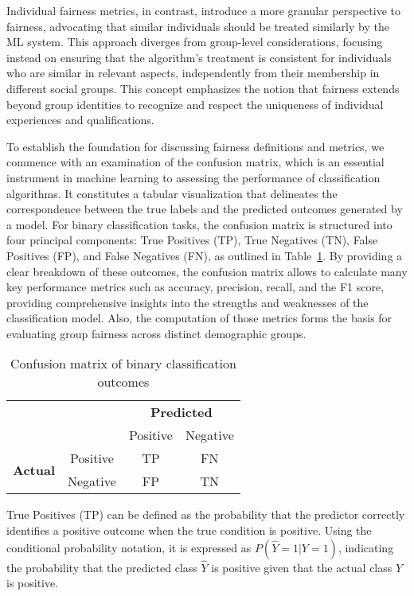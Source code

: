 Individual fairness metrics, in contrast, introduce a more granular perspective to fairness, advocating that similar individuals should be treated similarly by the ML system. This approach diverges from group-level considerations, focusing instead on ensuring that the algorithm’s treatment is consistent for individuals who are similar in relevant aspects, independently from their membership in different social groups. This concept emphasizes the notion that fairness extends beyond group identities to recognize and respect the uniqueness of individual experiences and qualifications.

To establish the foundation for discussing fairness definitions and metrics, we commence with an examination of the confusion matrix, which is an essential instrument in machine learning to assessing the performance of classification algorithms. It constitutes a tabular visualization that delineates the correspondence between the true labels and the predicted outcomes generated by a model. For binary classification tasks, the confusion matrix is structured into four principal components: True Positives (TP), True Negatives (TN), False Positives (FP), and False Negatives (FN), as outlined in Table~\ref{tab:confusion_matrix_definition}. By providing a clear breakdown of these outcomes, the confusion matrix allows to calculate many key performance metrics such as accuracy, precision, recall, and the F1 score, providing comprehensive insights into the strengths and weaknesses of the classification model. Also, the computation of those metrics forms the basis for evaluating group fairness across distinct demographic groups.

\begin{table}[h]
    \centering
    \caption{Confusion matrix of binary classification outcomes} \label{tab:confusion_matrix_definition}
    \begin{tabular}{cc|c|c|}
    \cline{3-4}
     & & \multicolumn{2}{c|}{\textbf{Predicted}} \\ \cline{3-4}
     & & Positive & Negative \\ \hline
    \multicolumn{1}{|c|}{\multirow{2}{*}{\textbf{Actual}}} & Positive & TP & FN \\ \cline{2-4}
    \multicolumn{1}{|c|}{} & Negative & FP & TN \\ \hline
    \end{tabular}
\end{table}


True Positives (TP) can be defined as the probability that the predictor correctly identifies a positive outcome when the true condition is positive. Using the conditional probability notation, it is expressed as $P(\hat{Y}=1|Y=1)$, indicating the probability that the predicted class $\hat{Y}$ is positive given that the actual class $Y$ is positive.

